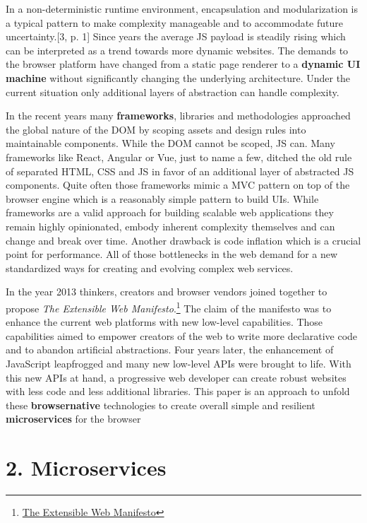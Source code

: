 \documentclass[]{article}
\begin{document}
In a non-deterministic runtime environment, encapsulation and
modularization is a typical pattern to make complexity manageable and to
accommodate future uncertainty.{[}3, p. 1{]} Since years the average JS
payload is steadily rising which can be interpreted as a trend towards
more dynamic websites. The demands to the browser platform have changed
from a static page renderer to a \textbf{dynamic UI machine} without
significantly changing the underlying architecture. Under the current
situation only additional layers of abstraction can handle complexity.

In the recent years many \textbf{frameworks}, libraries and
methodologies approached the global nature of the DOM by scoping assets
and design rules into maintainable components. While the DOM cannot be
scoped, JS can. Many frameworks like React, Angular or Vue, just to name
a few, ditched the old rule of separated HTML, CSS and JS in favor of an
additional layer of abstracted JS components. Quite often those
frameworks mimic a MVC pattern on top of the browser engine which is a
reasonably simple pattern to build UIs. While frameworks are a valid
approach for building scalable web applications they remain highly
opinionated, embody inherent complexity themselves and can change and
break over time. Another drawback is code inflation which is a crucial
point for performance. All of those bottlenecks in the web demand for a
new standardized ways for creating and evolving complex web services.

In the year 2013 thinkers, creators and browser vendors joined together
to propose \emph{The Extensible Web Manifesto}.\footnote{\href{https://extensiblewebmanifesto.org/}{The
  Extensible Web Manifesto}} The claim of the manifesto was to enhance
the current web platforms with new low-level capabilities. Those
capabilities aimed to empower creators of the web to write more
declarative code and to abandon artificial abstractions. Four years
later, the enhancement of JavaScript leapfrogged and many new low-level
APIs were brought to life. With this new APIs at hand, a progressive web
developer can create robust websites with less code and less additional
libraries. This paper is an approach to unfold these
\textbf{browsernative} technologies to create overall simple and
resilient \textbf{microservices} for the browser

\section{2. Microservices}\label{microservices}
\end{document}
